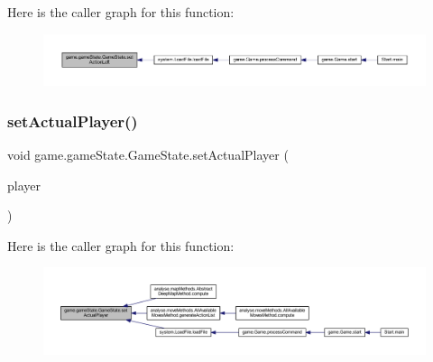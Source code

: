 Here is the caller graph for this function\+:
\nopagebreak
\begin{figure}[H]
\begin{center}
\leavevmode
\includegraphics[width=350pt]{classgame_1_1game_state_1_1_game_state_afdbab1b9e1116bfa025e589355bcc0fe_icgraph}
\end{center}
\end{figure}
\mbox{\label{classgame_1_1game_state_1_1_game_state_a92394b3a782113ba3e2a19397099dcd4}} 
\subsubsection{\texorpdfstring{set\+Actual\+Player()}{setActualPlayer()}}
{\footnotesize\ttfamily void game.\+game\+State.\+Game\+State.\+set\+Actual\+Player (\begin{DoxyParamCaption}\item[{\mbox{\hyperlink{enumgame_1_1_e_player}{E\+Player}}}]{player }\end{DoxyParamCaption})\hspace{0.3cm}{\ttfamily [inline]}}

Here is the caller graph for this function\+:
\nopagebreak
\begin{figure}[H]
\begin{center}
\leavevmode
\includegraphics[width=350pt]{classgame_1_1game_state_1_1_game_state_a92394b3a782113ba3e2a19397099dcd4_icgraph}
\end{center}
\end{figure}
\mbox{\label{classgame_1_1game_state_1_1_game_state_a4e627b92bbb28941616c628ae393baa6}} 

